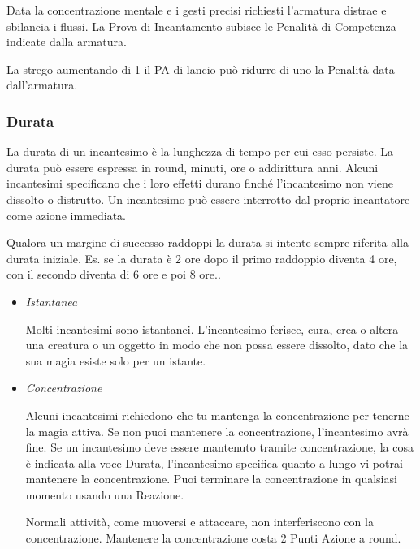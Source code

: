\documentclass[12pt,a4paper,twoside,openany]{book}
\begin{document}
\begin{multicols}{2}
Data la concentrazione mentale e i gesti precisi richiesti l'armatura distrae e sbilancia i flussi. La Prova di Incantamento subisce le Penalità di Competenza indicate dalla armatura.

La strego aumentando di 1 il PA di lancio può ridurre di uno la Penalità data dall'armatura.

\subsubsection{Durata}\label{magiedurata}

La durata di un incantesimo è la lunghezza di tempo per cui esso persiste. La durata può essere espressa in round, minuti, ore o addirittura anni. Alcuni incantesimi specificano che i loro effetti durano finché l'incantesimo non viene dissolto o distrutto. Un incantesimo può essere interrotto dal proprio incantatore come azione immediata.

Qualora un margine di successo raddoppi la durata si intente sempre riferita alla durata iniziale. Es. se la durata è 2 ore dopo il primo raddoppio diventa 4 ore, con il secondo diventa di 6 ore e poi 8 ore..

\begin{itemize}
	
\item
\textit{Istantanea}
	
Molti incantesimi sono istantanei. L'incantesimo ferisce, cura, crea o altera una creatura o un oggetto in modo che non possa essere dissolto, dato che la sua magia esiste solo per un istante.
	
\item
	
\textit{Concentrazione}
	
Alcuni incantesimi richiedono che tu mantenga la concentrazione per tenerne la magia attiva. Se non puoi mantenere la concentrazione, l'incantesimo avrà fine. Se un incantesimo deve essere mantenuto tramite concentrazione, la cosa è indicata alla voce Durata, l'incantesimo specifica quanto a lungo vi potrai mantenere la concentrazione. Puoi terminare la concentrazione in qualsiasi momento usando una Reazione.
	
Normali attività, come muoversi e attaccare, non interferiscono con la concentrazione. Mantenere la concentrazione costa 2 Punti Azione a round.


\end{itemize}
\end{multicols}
\end{document}
